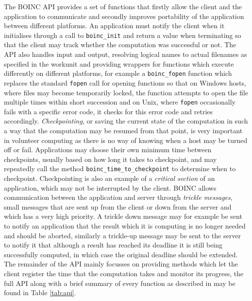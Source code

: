 The BOINC API provides a set of functions that firstly allow the client and the application to communicate and secondly improves portability of the application between different platforms.
An application must notify the client when it initialises through a call to \verb|boinc_init| and return a value when terminating so that the client may track whether the computation was successful or not. 
The API also handles input and output, resolving logical names to actual filenames as specified in the workunit and providing wrappers for functions which execute differently on different platforms, for example a \verb|boinc_fopen| function which replaces the standard \texttt{fopen} call for opening functions so that on Windows hosts, where files may become temporarily locked, the function attempts to open the file multiple times within short succession and on Unix, where \texttt{fopen} occasionally fails with a specific error code, it checks for this error code and retries accordingly. 
\emph{Checkpointing}, or saving the current state of the computation in such a way that the computation may be resumed from that point, is very important in volunteer computing as there is no way of knowing when a host may be turned off or fail. Applications may choose their own minimum time between checkpoints, usually based on how long it takes to checkpoint, and may repeatedly call the method \verb|boinc_time_to_checkpoint| to determine when to checkpoint. Checkpointing is also an example of a \emph{critical section} of an application,   which may not be interrupted by the client. 
BOINC  allows communication between the application and server through \emph{trickle messages}, small messages that are sent up from the client or down from the server and which has a very high priority. A trickle down message may for example be sent to notify an application that the result which it is computing is no longer needed and should be aborted, similarly a trickle-up message may be sent to the server to notify it that although a result  has reached its deadline it is still being successfully computed, in which case the original deadline should be extended.
The remainder of the API mainly focusses on providing methods which let the client register the time that the computation takes and monitor its progress, the full API along with a brief summary of every function as described in \cite{boincwiki, boincgit} may be found in Table \ref{tab:api}.


 

